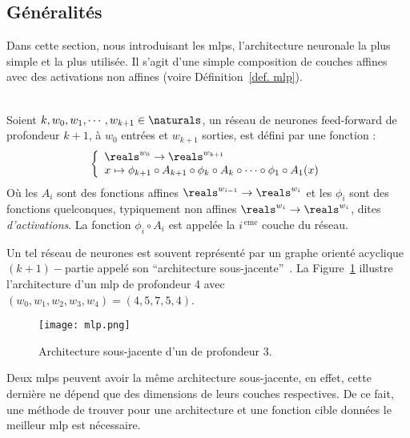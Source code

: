 \subsection{Généralités}

Dans cette section, nous introduisant les \glspl{mlp},
l'architecture neuronale la plus simple et la plus utilisée.
Il s'agit d'une simple composition de couches affines avec des activations non affines 
(voire Définition~\ref{def. mlp}).


\begin{definition}\ \\
    \label{def. mlp}
    Soient \(k, w_0, w_1, \cdots, w_{k+1}\in\naturals\), 
    un réseau de neurones feed-forward de profondeur \(k+1\), à \(w_0\) entrées et \(w_{k+1}\) sorties, 
    est défini par une fonction :
    \begin{equation}
        \label{eq. mlp}
        \left\{
        \begin{array}{l}
            \reals^{w_0} \to \reals^{w_{k+1}}\\
            x\mapsto
            \phi_{k+1} \circ A_{k+1} \circ \phi_k \circ A_k \circ \cdots \circ \phi_1 \circ A_1(x)
        \end{array}
        \right.
    \end{equation}
    Où les \(A_i\) sont des fonctions affines \(\reals^{w_{i-1}}\to\reals^{w_i}\) 
    et les \(\phi_i\) sont des fonctions quelconques, typiquement non affines
    \(\reals^{w_i}\to\reals^{w_i}\), dites \emph{d'activations}.
    La fonction \(\phi_i\circ A_i\) est appelée la \(i^{\, \mathrm{eme}}\) couche du réseau.
\end{definition}

Un tel réseau de neurones est souvent représenté par 
un graphe orienté acyclique \((k+1)-\)partie  appelé son ``architecture sous-jacente''~\parencite{Kearns_Vazirani_1994}. 
La Figure~\ref{fig. mlp} illustre l'architecture d'un \gls{mlp} de profondeur 4
avec \((w_0, w_1, w_2, w_3, w_4) = (4, 5, 7, 5, 4)\).


\begin{figure}[hbt]
    \begin{center}
        \texttt{[image: mlp.png]}
    \end{center}
    \caption{Architecture sous-jacente d'un  de profondeur 3.}
    \label{fig. mlp}
\end{figure}

Deux \glspl{mlp} peuvent avoir la même architecture sous-jacente,
en effet, cette dernière ne dépend que des dimensions de leurs couches respectives.
De ce fait, une méthode de trouver pour une architecture et une fonction cible données 
le meilleur \gls{mlp} est nécessaire.

